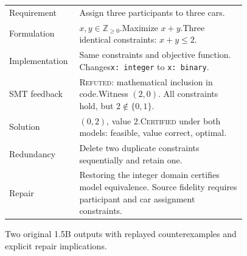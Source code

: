 \begin{figure}[H]
\begin{tcolorbox}[enhanced,colback=verdictlight,colframe=verdictblue,boxrule=0.65pt,arc=1.5mm,left=2mm,right=2mm,top=1.5mm,bottom=1.5mm,boxsep=0pt]
\begin{minipage}[t]{0.485\linewidth}
\scriptsize\renewcommand{\arraystretch}{1.12}
\begin{tabular}{@{}P{0.25\linewidth}P{0.67\linewidth}@{}}
\textcolor{verdictblue}{\textsf{Requirement}} & Assign three participants to three cars.\\
\textcolor{verdictblue}{\textsf{Formulation}} & \(x,y\in\mathbb Z_{\geq0}\).\newline Maximize \(x+y\).\newline Three identical constraints: \(x+y\leq2\).\\
\textcolor{caseorange}{\textsf{Implementation}} & Same constraints and objective function. Changes\newline\texttt{x: integer} to \texttt{x: binary}.\\
\textcolor{caseorange}{\textsf{SMT feedback}} & \textcolor{caseorange}{\textsc{Refuted}}: mathematical inclusion in code.\newline Witness \((2,0)\). All constraints hold, but \(2\notin\{0,1\}\).\\
\textcolor{casegreen}{\textsf{Solution}} & \((0,2)\), value \(2\).\newline\textcolor{casegreen}{\textsc{Certified}} under both models: feasible, value correct, optimal.\\
\textcolor{verdictblue}{\textsf{Redundancy}} & Delete two duplicate constraints sequentially and retain one.\\
\textcolor{casegreen}{\textsf{Repair}} & Restoring the integer domain certifies model equivalence. Source fidelity requires participant and car assignment constraints.\\
\end{tabular}
\end{minipage}
\end{tcolorbox}
\caption{Two original 1.5B outputs with replayed counterexamples and explicit repair implications.}
\label{fig:workedcases}
\end{figure}
